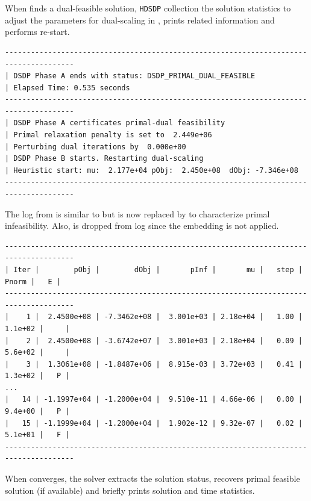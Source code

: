 \documentclass[10pt]{article}
\begin{document}
{When  finds a dual-feasible solution, {{\texttt{HDSDP}}}
collection the solution statistics to adjust the parameters for
dual-scaling in , prints related information and performs re-start.

\begin{lstlisting}
--------------------------------------------------------------------------------------
| DSDP Phase A ends with status: DSDP_PRIMAL_DUAL_FEASIBLE                                         
| Elapsed Time: 0.535 seconds                                                                   
--------------------------------------------------------------------------------------
| DSDP Phase A certificates primal-dual feasibility                                                
| Primal relaxation penalty is set to  2.449e+06 
| Perturbing dual iterations by  0.000e+00 
| DSDP Phase B starts. Restarting dual-scaling                                                     
| Heuristic start: mu:  2.177e+04 pObj:  2.450e+08  dObj: -7.346e+08                              
--------------------------------------------------------------------------------------
\end{lstlisting}	

The log from  is similar to  but
 is now replaced by  to characterize primal
infeasibility. Also,  is dropped from log since the embedding
is not applied.

\begin{lstlisting}
--------------------------------------------------------------------------------------
| Iter |        pObj |        dObj |       pInf |       mu |   step |    Pnorm |   E |
--------------------------------------------------------------------------------------
|    1 |  2.4500e+08 | -7.3462e+08 |  3.001e+03 | 2.18e+04 |   1.00 |  1.1e+02 |     |
|    2 |  2.4500e+08 | -3.6742e+07 |  3.001e+03 | 2.18e+04 |   0.09 |  5.6e+02 |     |
|    3 |  1.3061e+08 | -1.8487e+06 |  8.915e-03 | 3.72e+03 |   0.41 |  1.3e+02 |   P |
...
|   14 | -1.1997e+04 | -1.2000e+04 |  9.510e-11 | 4.66e-06 |   0.00 |  9.4e+00 |   P |
|   15 | -1.1999e+04 | -1.2000e+04 |  1.902e-12 | 9.32e-07 |   0.02 |  5.1e+01 |   F |
--------------------------------------------------------------------------------------
\end{lstlisting}

When  converges, the solver extracts the solution status,
recovers primal feasible solution (if available) and briefly prints solution
and time statistics.

}
\end{document}
